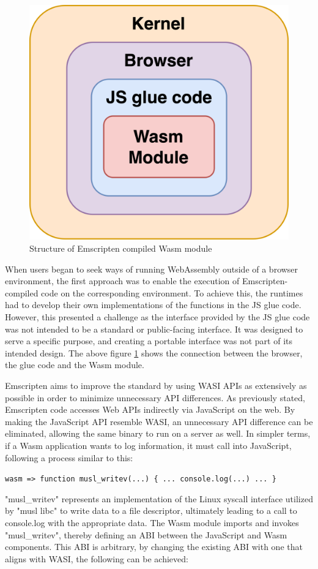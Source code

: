 \begin{figure}[H]
    \centering
        \includegraphics[width=0.6\linewidth]{images/wasm/Emscripten.png}
    \caption{Structure of Emscripten compiled Wasm module}
    \label{fig:emscripten}
\end{figure}

When users began to seek ways of running WebAssembly outside of a browser environment, the first approach was to enable the execution of Emscripten-compiled code on the corresponding environment.
To achieve this, the runtimes had to develop their own implementations of the functions in the JS glue code. However, this presented a challenge as the interface provided by the JS glue code was not intended to be a standard or public-facing interface. 
It was designed to serve a specific purpose, and creating a portable interface was not part of its intended design. The above figure \ref{fig:emscripten} shows the connection between the browser, the glue code and the Wasm module. 

Emscripten aims to improve the standard by using WASI APIs as extensively as possible in order to minimize unnecessary API differences. As previously stated, Emscripten code accesses Web APIs indirectly via JavaScript on the web. By making the JavaScript API resemble WASI, an unnecessary API difference can be eliminated, allowing the same binary to run on a server as well. In simpler terms, if a Wasm application wants to log information, it must call into JavaScript, following a process similar to this:

\verb|wasm => function musl_writev(...) { ... console.log(...) ... }|

"musl\_writev" represents an implementation of the Linux syscall interface utilized by "musl libc" to write data to a file descriptor, ultimately leading to a call to console.log with the appropriate data. The Wasm module imports and invokes "musl\_writev", thereby defining an ABI between the JavaScript and Wasm components. This ABI is arbitrary, by changing the existing ABI with one that aligns with WASI, the following can be achieved:

